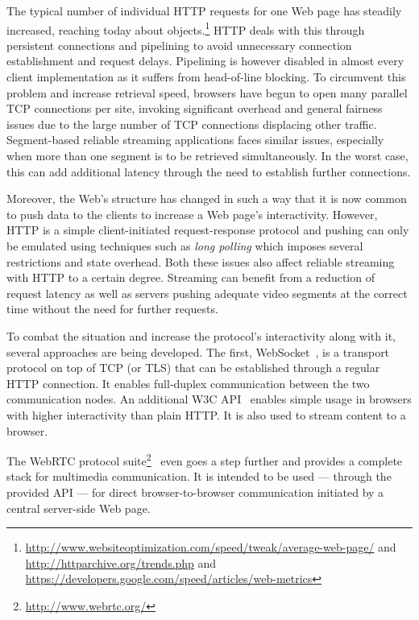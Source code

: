 The typical number of individual \gls{HTTP} requests for one Web page has steadily increased, reaching today about  objects.\footnote{\url{http://www.websiteoptimization.com/speed/tweak/average-web-page/} and \url{http://httparchive.org/trends.php} and \url{https://developers.google.com/speed/articles/web-metrics}} \gls{HTTP} deals with this through persistent connections and pipelining to avoid unnecessary connection establishment and request delays. Pipelining is however disabled in almost every client implementation as it suffers from head-of-line blocking. To circumvent this problem and increase retrieval speed, browsers have begun to open many parallel \gls{TCP} connections per site, invoking significant overhead and general fairness issues due to the large number of \gls{TCP} connections displacing other traffic. Segment-based reliable streaming applications faces similar issues, especially when more than one segment is to be retrieved simultaneously. In the worst case, this can add additional latency through the need to establish further connections.

Moreover, the Web's structure has changed in such a way that it is now common to push data to the clients to increase a Web page's interactivity. However, \gls{HTTP} is a simple client-initiated request-response protocol and pushing can only be emulated using techniques such as \textit{long polling} which imposes several restrictions and state overhead. Both these issues also affect reliable streaming with \gls{HTTP} to a certain degree. Streaming can benefit from a reduction of request latency as well as servers pushing adequate video segments at the correct time without the need for further requests.

To combat the situation and increase the protocol's interactivity along with it, several approaches are being developed. The first, WebSocket~\cite{rfc6455}, is a transport protocol on top of \gls{TCP} (or \gls{TLS}) that can be established through a regular \gls{HTTP} connection. It enables full-duplex communication between the two communication nodes. An additional \gls{W3C} \gls{API}~\cite{w3c2011websockets} enables simple usage in browsers with higher interactivity than plain \gls{HTTP}. It is also used to stream content to a browser.

The \acrshort{WebRTC} protocol suite\footnote{\url{http://www.webrtc.org/}}~\cite{webrtcdraft} even goes a step further and provides a complete stack for multimedia communication. It is intended to be used --- through the provided \gls{API} --- for direct browser-to-browser communication initiated by a central server-side Web page.

